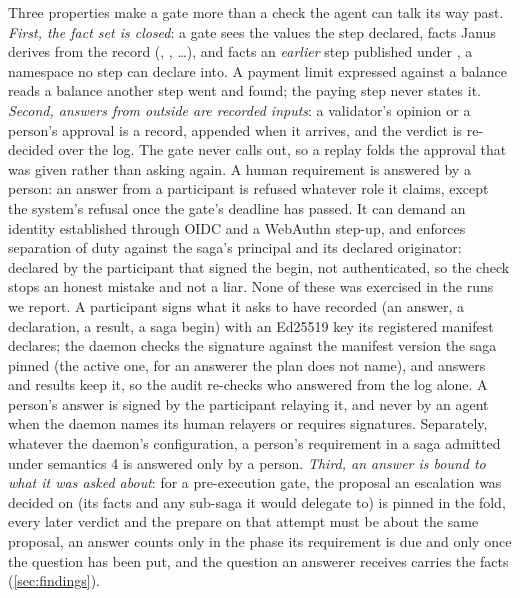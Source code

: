 Three properties make a gate more than a check the agent can talk its way past.
\emph{First, the fact set is closed}: a gate sees the values the step declared,
facts Janus derives from the record (,
, \dots), and facts an \emph{earlier} step published under
, a namespace no step can declare into. A payment
limit expressed against a balance reads a balance another step went and found;
the paying step never states it. \emph{Second, answers from outside are recorded
inputs}: a validator's opinion or a person's approval is a record, appended when
it arrives, and the verdict is re-decided over the log. The gate never calls
out, so a replay folds the approval that was given rather than asking again.
A human requirement is answered by a person: an answer from a participant is
refused whatever role it claims, except the system's refusal once the gate's
deadline has passed. It can demand an identity established through OIDC and a
WebAuthn step-up, and enforces separation of duty against the saga's principal
and its declared originator: declared by the participant that signed the begin,
not authenticated, so the check stops an honest mistake and not a liar. None of
these was exercised in the runs we report. A participant signs what
it asks to have recorded (an answer, a declaration, a result, a saga begin) with
an Ed25519 key its registered manifest declares; the daemon checks the signature
against the manifest version the saga pinned (the active one, for an answerer the
plan does not name), and answers and results keep it, so
the audit re-checks who answered from the log alone. A person's answer is signed
by the participant relaying it, and never by an agent when the daemon names its
human relayers or requires signatures. Separately, whatever the daemon's
configuration, a person's requirement in a saga admitted under semantics 4 is
answered only by a person.
\emph{Third, an answer is bound to what it was asked about}: for a pre-execution
gate, the proposal an escalation was decided on (its facts and any sub-saga it
would delegate to) is pinned in the fold, every later verdict and the prepare on
that attempt must be about the same proposal, an answer counts only in the phase
its requirement is due and only once the question has been put, and the question
an answerer receives carries the facts (\cref{sec:findings}).

